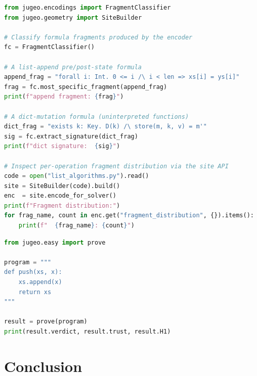 \documentclass[11pt]{article}
\begin{document}
\begin{lstlisting}[language=Python, caption={Classifying mutation encoding fragments and extracting SMT signatures with \JuGeo{}.}]
from jugeo.encodings import FragmentClassifier
from jugeo.geometry import SiteBuilder

# Classify formula fragments produced by the encoder
fc = FragmentClassifier()

# A list-append pre/post-state formula
append_frag = "forall i: Int. 0 <= i /\ i < len => xs[i] = ys[i]"
frag = fc.most_specific_fragment(append_frag)
print(f"append fragment: {frag}")

# A dict-mutation formula (uninterpreted functions)
dict_frag = "exists k: Key. D(k) /\ store(m, k, v) = m'"
sig = fc.extract_signature(dict_frag)
print(f"dict signature:  {sig}")

# Inspect per-operation fragment distribution via the site API
code = open("list_algorithms.py").read()
site = SiteBuilder(code).build()
enc  = site.encode_for_solver()
print(f"Fragment distribution:")
for frag_name, count in enc.get("fragment_distribution", {}).items():
    print(f"  {frag_name}: {count}")
\end{lstlisting}

\begin{lstlisting}[language=Python, caption={A JuGeo-backed list example using the installed easy API.}]
from jugeo.easy import prove

program = """
def push(xs, x):
    xs.append(x)
    return xs
"""

result = prove(program)
print(result.verdict, result.trust, result.H1)
\end{lstlisting}

\section{Conclusion}\label{sec:conclusion}
\end{document}
